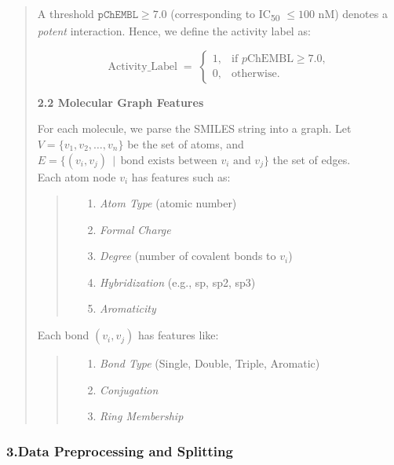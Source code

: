 \documentclass[fontsize=11pt]{article}
\begin{document}
\begin{itemize}
\begin{quote}
    A threshold $\texttt{pChEMBL} \ge 7.0$ (corresponding to IC\textsubscript{50} $\leq 100\text{ nM}$) 
    denotes a \emph{potent} interaction. Hence, we define the activity label as:
    
    \[
        \text{Activity\_Label} \;=\; 
        \begin{cases}
        1, & \text{if } p\text{ChEMBL} \ge 7.0,\\
        0, & \text{otherwise}.
        \end{cases}
    \]
    
    \textbf{2.2 Molecular Graph Features}
    
    \quad For each molecule, we parse the SMILES string into a graph. Let $V = \{v_1, v_2, \dots, v_n\}$ 
    be the set of atoms, and $E = \{(v_i, v_j)\,\mid\, \text{bond exists between }v_i \text{ and } v_j\}$ the set of edges. \\
    
    Each atom node $v_i$ has features such as:
    \begin{quote}
        \begin{itemize}
            \item[1.] \emph{Atom Type} (atomic number)
            \item[2.] \emph{Formal Charge}
            \item[3.] \emph{Degree} (number of covalent bonds to $v_i$)
            \item[4.] \emph{Hybridization} (e.g., sp, sp2, sp3)
            \item[5.] \emph{Aromaticity}
        \end{itemize}
    \end{quote}
    Each bond $(v_i, v_j)$ has features like:
    \begin{quote}
        \begin{itemize}
            \item[1.] \emph{Bond Type} (Single, Double, Triple, Aromatic)
            \item[2.] \emph{Conjugation}
            \item[3.] \emph{Ring Membership}
        \end{itemize}
    \end{quote}

\end{quote}

\subsubsection*{3.\quad Data Preprocessing and Splitting}


\end{itemize}
\end{document}
